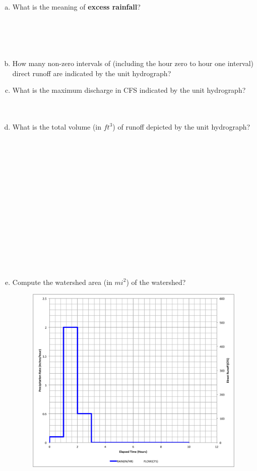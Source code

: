 \documentclass[12pt]{article}
\begin{document}
\begin{enumerate}
\begin{enumerate}[a)]
\item What is the meaning of \textbf{excess rainfall}?\\
~\\
~\\
~\\
~\\
\item How many non-zero intervals of (including the hour zero to hour one interval) direct runoff are indicated by the unit hydrograph? \\
\clearpage
\item What is the maximum discharge in CFS indicated by the unit hydrograph?\\
~\\
~\\
\item What is the total volume (in $ft^3$) of runoff depicted by the unit hydrograph? \\
~\\
~\\
~\\
~\\
~\\
~\\
~\\
~\\
~\\
~\\
~\\
~\\
~\\
~\\
\item Compute the watershed area (in $mi^2$) of the watershed? \\
\clearpage
\begin{figure}[htbp] %
   \centering
   \includegraphics[width=5in]{UnitHydrographOutput.png} 

\end{figure}
\end{enumerate}
\end{enumerate}
\end{document}
